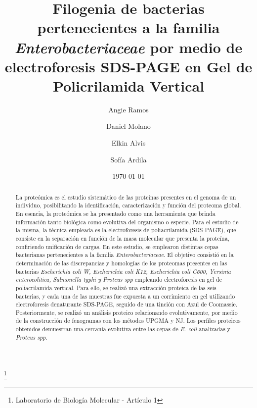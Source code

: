 \documentclass[%
 reprint,
 amsmath,amssymb,
 aps,
showkeys,
letter,
12pts
]{revtex4-1}
\begin{document}

\title{Filogenia de bacterias pertenecientes a la familia \textit{Enterobacteriaceae} por medio de electroforesis SDS-PAGE en Gel de Policrilamida Vertical}%
\thanks{Laboratorio de Biología Molecular - Artículo 1}%

\author{Angie Ramos}
\author{Daniel Molano}%
\author{Elkin Alvis}
\author{Sof\'ia Ardila}

%


\date[Fecha: ]{\today}%

\begin{abstract} %
	La proteómica es el estudio sistemático de las proteínas presentes en el genoma de un individuo, posibilitando la identificación, caracterización y función del proteoma global. En esencia, la proteómica se ha presentado como una herramienta que brinda información tanto biológica como evolutiva del organismo o especie. Para el estudio de la misma, la técnica empleada es la electroforesis de poliacrilamida (SDS-PAGE), que consiste en la separación en función de la masa molecular que presenta la proteína, confiriendo unificación de cargas. En este estudio, se emplearon distintas cepas bacterianas pertenecientes a la familia \textit{Enterobacteriaceae}. El objetivo consistió en la determinación de las discrepancias y homologías de los proteomas presentes en  las bacterias \textit{Escherichia coli W, Escherichia coli K12, Escherichia coli C600, Yersinia enterocolitica, Salmonella typhi y Proteus spp} empleando electroforesis en gel de poliacrilamida vertical. Para ello, se realizó una extracción proteica de las seis bacterias, y cada una de las muestras fue expuesta a un corrimiento en gel utilizando electroforesis denaturante SDS-PAGE, seguido de una tinción con Azul de Coomassie. Posteriormente, se realizó un análisis proteico relacionando evolutivamente, por medio de la construcción de fenogramas con los métodos UPGMA y NJ. Los perfiles proteicos obtenidos demuestran una cercanía evolutiva entre las cepas de \textit{E. coli} analizadas y \textit{Proteus spp}.
	 
\end{abstract}
\end{document}
